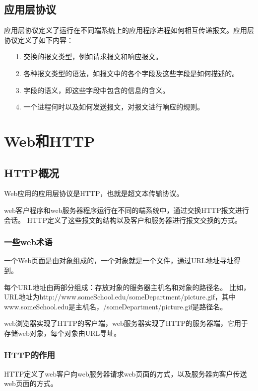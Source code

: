 \documentclass[a4paper,left=2.5cm,right=2.5cm,11pt]{article}
\begin{document}
\subsection{应用层协议}
	应用层协议定义了运行在不同端系统上的应用程序进程如何相互传递报文。应用层协议定义了如下内容：
	\begin{itemize}
		\item[1.] 交换的报文类型，例如请求报文和响应报文。
		\item[2.] 各种报文类型的语法，如报文中的各个字段及这些字段是如何描述的。
		\item[3.] 字段的语义，即这些字段中包含的信息的含义。
		\item[4.] 一个进程何时以及如何发送报文，对报文进行响应的规则。
	\end{itemize}

\section{Web和HTTP}
\subsection{HTTP概况}
	Web应用的应用层协议是HTTP，也就是超文本传输协议。\par

	web客户程序和web服务器程序运行在不同的端系统中，通过交换HTTP报文进行会话。
	HTTP定义了这些报文的结构以及客户和服务器进行报文交换的方式。

\subsubsection{一些web术语}
	一个Web页面是由对象组成的，一个对象就是一个文件，通过URL地址寻址得到。\par

	每个URL地址由两部分组成：存放对象的服务器主机名和对象的路径名。
	比如，URL地址为http://www.someSchool.edu/someDepartment/picture.gif，其中www.someSchool.edu是主机名，/someDepartment/picture.gif是路径名。\par

	web浏览器实现了HTTP的客户端，web服务器实现了HTTP的服务器端，它用于存储web对象，每个对象由URL寻址。

\subsubsection{HTTP的作用}
	HTTP定义了web客户向web服务器请求web页面的方式，以及服务器向客户传送web页面的方式。\par
\end{document}
